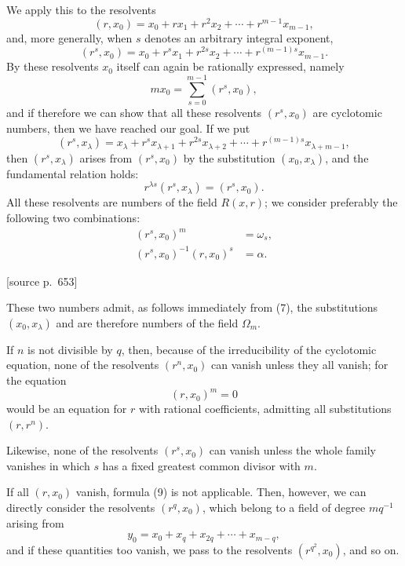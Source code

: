 \documentclass[11pt]{article}
\newcommand{\srcpage}[1]{\par\medskip\noindent\textsf{[source p.~#1]}\par\smallskip}
\begin{document}
We apply this to the resolvents
\begin{equation}
  (r,x_0)=x_0+rx_1+r^2x_2+\cdots+r^{m-1}x_{m-1},
\tag{3}
\end{equation}
and, more generally, when $s$ denotes an arbitrary integral exponent,
\begin{equation}
  (r^s,x_0)=x_0+r^s x_1+r^{2s}x_2+\cdots+r^{(m-1)s}x_{m-1}.
\tag{4}
\end{equation}
By these resolvents $x_0$ itself can again be rationally expressed, namely
\begin{equation}
  m x_0=\sum_{s=0}^{m-1}(r^s,x_0),
\tag{5}
\end{equation}
and if therefore we can show that all these resolvents $(r^s,x_0)$ are cyclotomic numbers, then we have reached our goal. If we put
\begin{equation}
  (r^s,x_\lambda)=x_\lambda+r^s x_{\lambda+1}+r^{2s}x_{\lambda+2}+\cdots+r^{(m-1)s}x_{\lambda+m-1},
\tag{6}
\end{equation}
then $(r^s,x_\lambda)$ arises from $(r^s,x_0)$ by the substitution $(x_0,x_\lambda)$, and the fundamental relation holds:
\begin{equation}
  r^{\lambda s}(r^s,x_\lambda)=(r^s,x_0).
\tag{7}
\end{equation}
All these resolvents are numbers of the field $R(x,r)$; we consider preferably the following two combinations:
\begin{align}
  (r^s,x_0)^m &= \omega_s, \tag{8}\\
  (r^s,x_0)^{-1}(r,x_0)^s &= \alpha. \tag{9}
\end{align}

\srcpage{653}
These two numbers admit, as follows immediately from (7), the substitutions $(x_0,x_\lambda)$ and are therefore numbers of the field $\Omega_m$.

If $n$ is not divisible by $q$, then, because of the irreducibility of the cyclotomic equation, none of the resolvents $(r^n,x_0)$ can vanish unless they all vanish; for the equation
\[
  (r,x_0)^m=0
\]
would be an equation for $r$ with rational coefficients, admitting all substitutions $(r,r^n)$.

Likewise, none of the resolvents $(r^s,x_0)$ can vanish unless the whole family vanishes in which $s$ has a fixed greatest common divisor with $m$.

If all $(r,x_0)$ vanish, formula (9) is not applicable. Then, however, we can directly consider the resolvents $(r^q,x_0)$, which belong to a field of degree $m q^{-1}$ arising from
\[
  y_0=x_0+x_q+x_{2q}+\cdots+x_{m-q},
\]
and if these quantities too vanish, we pass to the resolvents $(r^{q^2},x_0)$, and so on.
\end{document}

